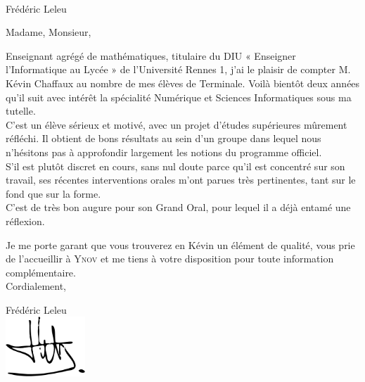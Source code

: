 \documentclass[a4paper,12pt,french]{article}
\begin{document}
\ \\

Frédéric Leleu\\



\begin{center}
	Madame, Monsieur,
	\end{center}


Enseignant agrégé de mathématiques, titulaire du DIU « Enseigner l'Informatique au Lycée » de l'Université Rennes 1, j'ai le plaisir de compter M. Kévin Chaffaux au nombre de mes élèves de Terminale.
Voilà bientôt deux années qu'il suit avec intérêt la spécialité Numérique et Sciences Informatiques sous ma tutelle.\\

C'est un élève sérieux et motivé, avec un projet d'études supérieures mûrement réfléchi. Il obtient de bons résultats au sein d'un groupe dans lequel nous n'hésitons pas à approfondir largement les notions du programme officiel.\\
S'il est plutôt discret en cours, sans nul doute parce qu'il est concentré sur son travail, ses récentes interventions orales m'ont parues très pertinentes, tant sur le fond que sur la forme.\\
C'est de très bon augure pour son Grand Oral, pour lequel il a déjà entamé une réflexion.

Je me porte garant que vous trouverez en Kévin un élément de qualité, vous prie de l'accueillir à \textsc{Ynov} et me tiens à votre disposition pour toute information complémentaire.\\

Cordialement,
\begin{flushright}
	Frédéric Leleu\\
    \includegraphics[width=3cm]{signature}
\end{flushright}
\end{document}
